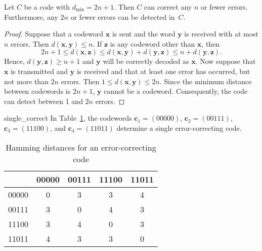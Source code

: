  
\begin{theorem}\label{algecodes:min_distance_theorem}
Let $C$ be a code with $d_{\min} = 2n + 1$. Then $C$ can correct any
$n$ or fewer errors.  Furthermore, any $2n$ or fewer errors can be
detected in~$C$. 
\end{theorem}
 
 
\begin{proof}
Suppose that a codeword ${\mathbf x}$ is sent and the word ${\mathbf y}$
is received with at most $n$ errors. Then $d( {\mathbf x}, {\mathbf y})
\leq n$. If ${\mathbf z}$ is any codeword other than ${\mathbf x}$, then
\[
2n+1
\leq
d( {\mathbf x}, {\mathbf z})
\leq
d( {\mathbf x}, {\mathbf y}) + d( {\mathbf y}, {\mathbf z})
\leq
n + d( {\mathbf y}, {\mathbf z}).
\]
Hence, $d({\mathbf y}, {\mathbf z} ) \geq n+1$ and ${\mathbf y}$ will be
correctly decoded as ${\mathbf x}$. Now suppose that ${\mathbf x}$ is
transmitted and ${\mathbf y}$ is received and that at least one error 
has occurred, but not more than $2n$ errors. Then $1 \leq d( {\mathbf x},
{\mathbf y} ) \leq 2n$.  Since the minimum distance between codewords is
$2n +1$, ${\mathbf y}$ cannot be a codeword.  Consequently, the code can
detect between 1 and $2n$ errors. 
\end{proof}
 
 
\begin{example}{single_correct}
In Table~\ref{Hamming_dist}, the codewords ${\mathbf c}_1 = (00000)$, ${\mathbf c}_2 = (00111)$,
${\mathbf c}_3 = (11100)$, and ${\mathbf c}_4 = (11011)$ determine a
single error-correcting code.  
\end{example}
 
 
\begin{table}[htb]

\begin{center}
{\small
\begin{tabular}{|c|cccc|}
\hline
      & 00000 & 00111 & 11100 & 11011 \\ \hline
00000 & 0     & 3     & 3     & 4 \\
00111 & 3     & 0     & 4     & 3 \\
11100 & 3     & 4     & 0     & 3 \\
11011 & 4     & 3     & 3     & 0 \\
\hline
\end{tabular}
}
\caption{ Hamming distances for an error-correcting code}\label{Hamming_dist}
\end{center}
\end{table}
 
